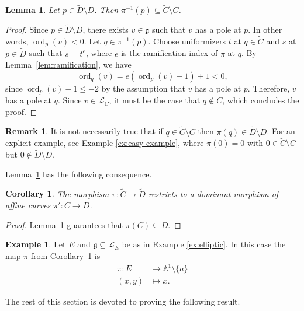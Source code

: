 \documentclass[12pt]{amsart}
\theoremstyle{plain}
\newtheorem{lemma}[theorem]{Lemma}
\newtheorem{corollary}[theorem]{Corollary}
\theoremstyle{definition}
\newtheorem{example}[theorem]{Example}
\newtheorem{remark}[theorem]{Remark}
\numberwithin{equation}{section}
\def\g{\mathfrak{g}}
\def\L{\mathcal{L}}
\def\Aa{\mathbb{A}}
\DeclareMathOperator{\ord}{ord}
\begin{document}
\begin{lemma}\label{lem:poles in D come from poles in C}
    Let $p \in \widetilde{D} \setminus D$. Then $\pi^{-1}(p) \subseteq \widetilde{C} \setminus C$.
\end{lemma}
\begin{proof}
    Since $p \in \widetilde{D} \setminus D$, there exists $v \in \g$ such that $v$ has a pole at $p$. In other words, $\ord_p(v) < 0$. Let $q \in \pi^{-1}(p)$. Choose uniformizers $t$ at $q \in \widetilde{C}$ and $s$ at $p \in \widetilde{D}$ such that $s = t^e$, where $e$ is the ramification index of $\pi$ at $q$. By Lemma~\ref{lem:ramification}, we have
    $$\ord_q(v) = e(\ord_p(v) - 1) + 1 < 0,$$
    since $\ord_p(v) - 1 \leq -2$ by the assumption that $v$ has a pole at $p$. Therefore, $v$ has a pole at $q$. Since $v \in \L_C$, it must be the case that $q \notin C$, which concludes the proof.
\end{proof}

\begin{remark}
    It is not necessarily true that if $q \in \widetilde{C} \setminus C$ then $\pi(q) \in \widetilde{D} \setminus D$. For an explicit example, see Example \ref{ex:easy example}, where $\pi(0) = 0$ with $0 \in \widetilde{C} \setminus C$ but $0 \notin \widetilde{D} \setminus D$.
\end{remark}

Lemma~\ref{lem:poles in D come from poles in C} has the following consequence.

\begin{corollary}\label{cor:C maps to D}
    The morphism $\pi \colon \widetilde{C} \to \widetilde{D}$ restricts to a dominant morphism of affine curves $\pi' \colon C \to D$.
\end{corollary}
\begin{proof}
    Lemma~\ref{lem:poles in D come from poles in C} guarantees that $\pi(C) \subseteq D$.
\end{proof}

\begin{example}
    Let $E$ and $\g \subseteq \L_E$ be as in Example \ref{ex:elliptic}. In this case the map $\pi$ from Corollary~\ref{cor:C maps to D} is
    \begin{align*}
        \pi \colon E &\to \Aa^1 \setminus \{a\} \\
        (x,y) &\mapsto x.
    \end{align*}
\end{example}

The rest of this section is devoted to proving the following result.
\end{document}
